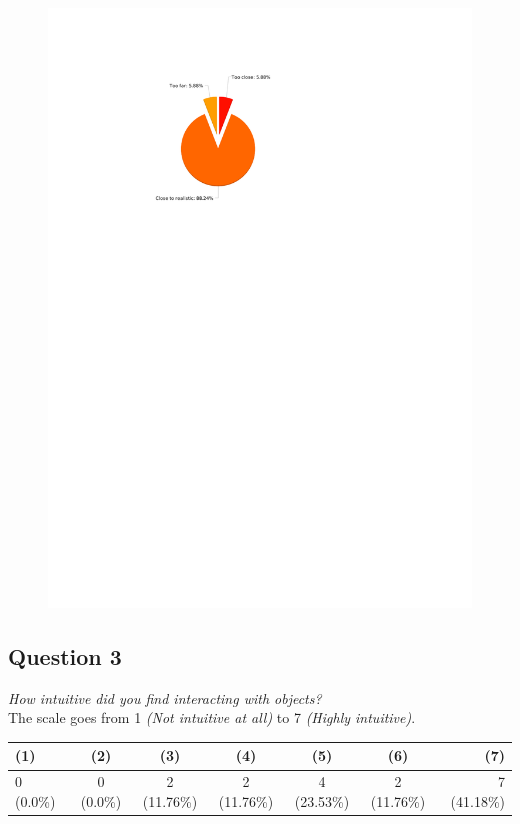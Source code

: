 \begin{figure}[H]
	\centering
	\includegraphics[width=0.6\linewidth]{gfx/Chapter_EvaluationResults/ALFTask/question2}
\end{figure}

\subsection{Question 3}
\emph{How intuitive did you find interacting with objects?}\\

The scale goes from 1 \emph{(Not intuitive at all)} to 7 \emph{(Highly intuitive)}.
\begin{table}[H]
	\begin{center}
		\small \begin{tabular*}{1.15\columnwidth}{lcccccr}
			\\ \hline \hline
			(1) & (2) & (3) & (4) & (5) & (6) & (7) \\ \hline \hline

		 	0 (0.0\%) & 0 (0.0\%) & 2 (11.76\%) & 2 (11.76\%) &	4 (23.53\%) & 2 (11.76\%) & 7 (41.18\%)\\ \hline
		\end{tabular*}
	\end{center}
\end{table}

